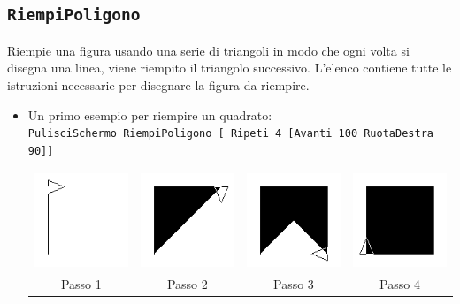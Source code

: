 \subsection{\texttt{RiempiPoligono}}
\noindent
{}
Riempie una figura usando una serie di triangoli in modo che ogni volta si disegna una linea, viene riempito il triangolo successivo. L'elenco contiene tutte le istruzioni necessarie per disegnare la figura da riempire.\\
\begin{itemize}
	\item Un primo esempio per riempire un quadrato:\\
		\lstinline$PulisciSchermo RiempiPoligono [ Ripeti 4 [Avanti 100 RuotaDestra 90]]$
	\begin{center}
		\begin{tabular}{cccc}
			\includegraphics[width=3cm]{pics/fillpolygonsquare1.png}& \includegraphics[width=3cm]{pics/fillpolygonsquare2.png}& \includegraphics[width=3cm]{pics/fillpolygonsquare3.png}& \includegraphics[width=3cm]{pics/fillpolygonsquare4.png}\\ 
			Passo 1& Passo 2& Passo 3& Passo 4\\
		\end{tabular}

\end{center}
\end{itemize}
